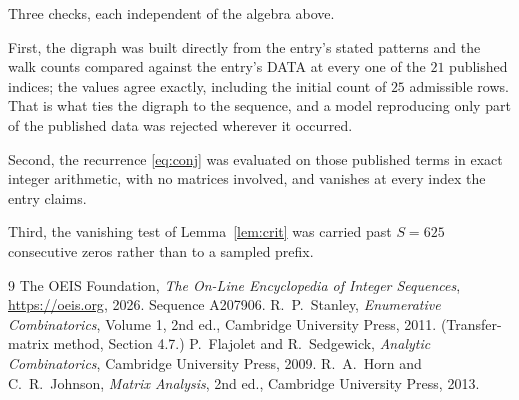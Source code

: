 \documentclass[11pt,a4paper]{article}
\theoremstyle{plain}
\theoremstyle{definition}
\begin{document}
Three checks, each independent of the algebra above.

First, the digraph was built directly from the entry's stated patterns and the walk counts
compared against the entry's DATA at every one of the $21$ published indices; the
values agree exactly, including the initial count of $25$ admissible rows. That is
what ties the digraph to the sequence, and a model reproducing only part of the published
data was rejected wherever it occurred.

Second, the recurrence \eqref{eq:conj} was evaluated on those published terms in exact
integer arithmetic, with no matrices involved, and vanishes at every index the entry claims.

Third, the vanishing test of Lemma~\ref{lem:crit} was carried past $S=625$ consecutive
zeros rather than to a sampled prefix.

\begin{thebibliography}{9}
 The OEIS Foundation, \emph{The On-Line Encyclopedia of Integer
Sequences}, \url{https://oeis.org}, 2026. Sequence A207906.
 R.~P.~Stanley, \emph{Enumerative Combinatorics}, Volume 1, 2nd ed.,
Cambridge University Press, 2011. (Transfer-matrix method, Section 4.7.)
 P.~Flajolet and R.~Sedgewick, \emph{Analytic Combinatorics}, Cambridge
University Press, 2009.
 R.~A.~Horn and C.~R.~Johnson, \emph{Matrix Analysis}, 2nd ed., Cambridge
University Press, 2013.
\end{thebibliography}
\end{document}
